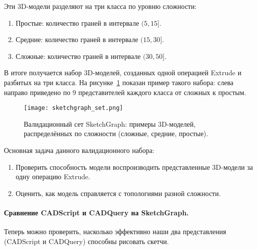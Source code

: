 Эти 3D-модели разделяют на три класса по уровню сложности:
\begin{enumerate}
    \item Простые: количество граней в интервале $(5, 15]$.
    \item Средние: количество граней в интервале $(15, 30]$.
    \item Сложные: количество граней в интервале $(30, 50]$.
\end{enumerate}

В итоге получается набор 3D-моделей, созданных одной операцией Extrude и разбитых на три класса. На рисунке~\ref{fig:sketchgraph_set} показан пример такого набора: слева направо приведено по 9 представителей каждого класса от сложных к простым.

\begin{figure}[h!]
    \centering
    \texttt{[image: sketchgraph\_set.png]}
    \caption{Валидационный сет SketchGraph: примеры 3D-моделей, распределённых по сложности (сложные, средние, простые).}
    \label{fig:sketchgraph_set}
\end{figure}

Основная задача данного валидационного набора:
\begin{enumerate}
    \item Проверить способность модели воспроизводить представленные 3D-модели за одну операцию Extrude.
    \item Оценить, как модель справляется с топологиями разной сложности.
\end{enumerate}

\paragraph{Сравнение CADScript и CADQuery на SketchGraph.}

Теперь можно проверить, насколько эффективно наши два представления (CADScript и CADQuery) способны рисовать скетчи.

